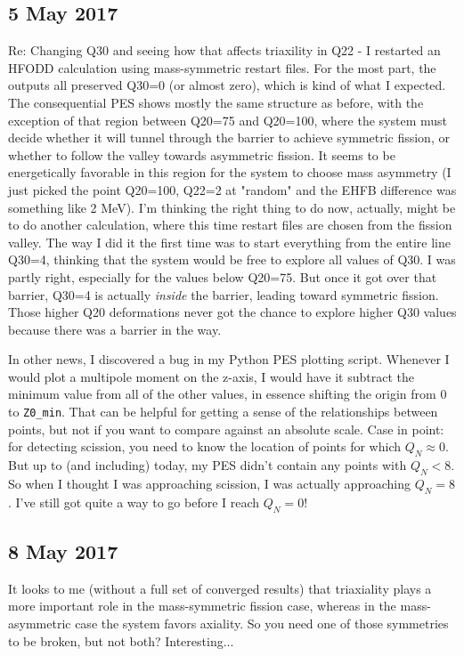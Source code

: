 \documentclass[]{report}
\begin{document}
\subsection*{5 May 2017}
Re: Changing Q30 and seeing how that affects triaxility in Q22 - I restarted an HFODD calculation using mass-symmetric  restart files. For the most part, the outputs all preserved Q30=0 (or almost zero), which is kind of what I expected. The consequential PES shows mostly the same structure as before, with the exception of that region between Q20=75 and Q20=100, where the system must decide whether it will tunnel through the barrier to achieve symmetric fission, or whether to follow the valley towards asymmetric fission. It seems to be energetically favorable in this region for the system to choose mass asymmetry (I just picked the point Q20=100, Q22=2 at "random" and the EHFB difference was something like 2 MeV). I'm thinking the right thing to do now, actually, might be to do another calculation, where this time restart files are chosen from the fission valley. The way I did it the first time was to start everything from the entire line Q30=4, thinking that the system would be free to explore all values of Q30. I was partly right, especially for the values below Q20=75. But once it got over that barrier, Q30=4 is actually \textit{inside} the barrier, leading toward symmetric fission. Those higher Q20 deformations never got the chance to explore higher Q30 values because there was a barrier in the way.

In other news, I discovered a bug in my Python PES plotting script. Whenever I would plot a multipole moment on the z-axis, I would have it subtract the minimum value from all of the other values, in essence shifting the origin from 0 to \texttt{Z0\_min}. That can be helpful for getting a sense of the relationships between points, but not if you want to compare against an absolute scale. Case in point: for detecting scission, you need to know the location of points for which $Q_N\approx0$. But up to (and including) today, my PES didn't contain any points with $Q_N < 8$. So when I thought I was approaching scission, I was actually approaching $Q_N=8$. I've still got quite a way to go before I reach $Q_N=0$!

\subsection*{8 May 2017}
It looks to me (without a full set of converged results) that triaxiality plays a more important role in the mass-symmetric fission case, whereas in the mass-asymmetric case the system favors axiality. So you need one of those symmetries to be broken, but not both? Interesting...
\end{document}

